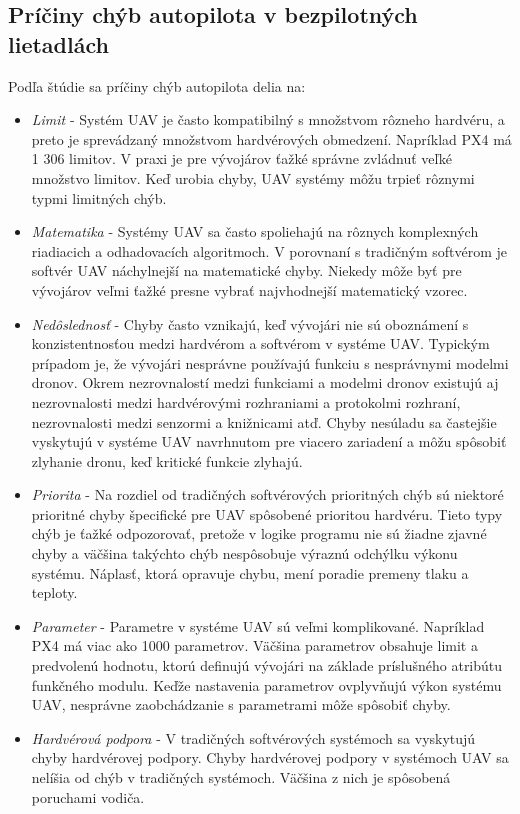 \documentclass[10pt,twoside,slovak,a4paper]{article}
\begin{document}
\subsection{Príčiny chýb autopilota v bezpilotných lietadlách}

Podľa štúdie sa príčiny chýb autopilota delia na:

\begin{itemize}
\item \emph{Limit} - Systém UAV je často kompatibilný s množstvom rôzneho hardvéru, a preto je sprevádzaný množstvom hardvérových obmedzení. Napríklad PX4 má 1 306 limitov. V praxi je pre vývojárov ťažké správne zvládnuť veľké množstvo limitov. Keď urobia chyby, UAV systémy môžu trpieť rôznymi typmi limitných chýb.
\item \emph{Matematika} - Systémy UAV sa často spoliehajú na rôznych komplexných riadiacich a odhadovacích algoritmoch. V porovnaní s tradičným softvérom je softvér UAV náchylnejší na matematické chyby. Niekedy môže byť pre vývojárov veľmi ťažké presne vybrať najvhodnejší matematický vzorec.
\item \emph{Nedôslednosť} - Chyby často vznikajú, keď vývojári nie sú oboznámení s konzistentnosťou medzi hardvérom a softvérom v systéme UAV. Typickým prípadom je, že vývojári nesprávne používajú funkciu s nesprávnymi modelmi dronov. Okrem nezrovnalostí medzi funkciami a modelmi dronov existujú aj nezrovnalosti medzi hardvérovými rozhraniami a protokolmi rozhraní, nezrovnalosti medzi senzormi a knižnicami atď. Chyby nesúladu sa častejšie vyskytujú v systéme UAV navrhnutom pre viacero zariadení a môžu spôsobiť zlyhanie dronu, keď kritické funkcie zlyhajú.
\item \emph{Priorita} - Na rozdiel od tradičných softvérových prioritných chýb sú niektoré prioritné chyby špecifické pre UAV spôsobené prioritou hardvéru. Tieto typy chýb je ťažké odpozorovať, pretože v logike programu nie sú žiadne zjavné chyby a väčšina takýchto chýb nespôsobuje výraznú odchýlku výkonu systému. Náplasť, ktorá opravuje chybu, mení poradie premeny tlaku a teploty.
\item \emph{Parameter} - Parametre v systéme UAV sú veľmi komplikované. Napríklad PX4
má viac ako 1000 parametrov. Väčšina parametrov obsahuje limit
a predvolenú hodnotu, ktorú definujú vývojári na základe príslušného atribútu funkčného modulu. Keďže nastavenia parametrov ovplyvňujú výkon systému UAV, nesprávne zaobchádzanie s parametrami
môže spôsobiť chyby.
\item \emph{Hardvérová podpora} - V tradičných softvérových systémoch sa vyskytujú chyby hardvérovej podpory. Chyby hardvérovej podpory v systémoch UAV sa nelíšia od chýb v tradičných systémoch. Väčšina z nich je spôsobená poruchami vodiča. 

\end{itemize}
\end{document}
